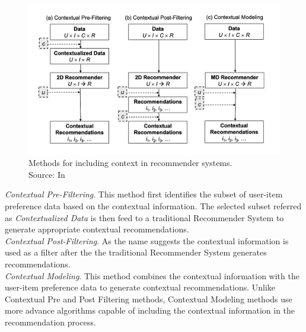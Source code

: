 \begin{figure}
    \centering
    \includegraphics[scale=0.6]{chapters/figures/cars_types.png}
    \caption{Methods for including context in recommender systems.\\
    Source: In \textcite[17]{Adomavicius2011}}
    \label{fig:cars_types}
\end{figure}

\emph{Contextual Pre-Filtering}. This method first identifies the subset of user-item preference data based on the contextual information. The selected subset referred as \emph{Contextualized Data} is then feed to a traditional Recommender System to generate appropriate contextual recommendations. \\

\emph{Contextual Post-Filtering}. As the name suggests the contextual information is used as a filter after the the traditional Recommender System generates recommendations.  \\

\emph{Contextual Modeling}. This method combines the contextual information with the user-item preference data to generate contextual recommendations. Unlike Contextual Pre and Post Filtering methods, Contextual Modeling methods use more advance algorithms capable of including the contextual information in the recommendation process. 


